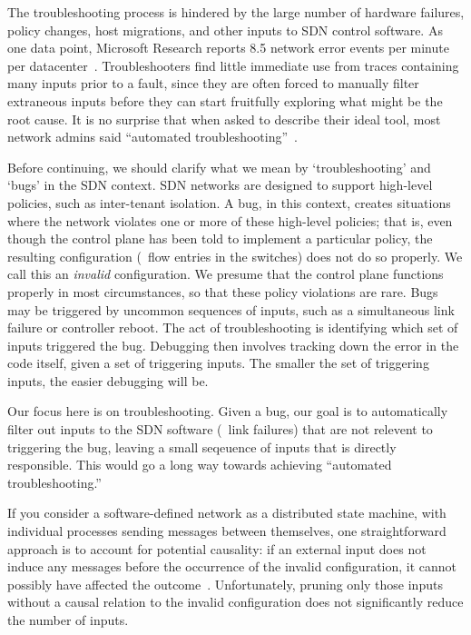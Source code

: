 The troubleshooting process is hindered by the large number of hardware failures,
policy changes, host migrations, and other inputs to SDN control software.
As one data point, Microsoft Research
reports 8.5 network error events per minute per
datacenter~\cite{Greenberg:2009:VSF:1592568.1592576}.
Troubleshooters find little immediate use from traces containing many inputs
prior to a fault,
since they are often forced to manually filter extraneous inputs
before they can start fruitfully exploring what might be the root cause.
It is no surprise that when asked to describe their
ideal tool, most network admins said ``automated troubleshooting''~\cite{Zeng:Survey}.


Before continuing, we should clarify what we mean by `troubleshooting' and `bugs' in the SDN context.
SDN networks are designed to support high-level policies, such as inter-tenant
isolation. A bug, in this context, creates situations
where the network violates one or more of these high-level policies; that is, even though the control plane
has been told to implement a particular policy, the resulting configuration (\ie~flow entries in the switches)
does not do so properly. We call this an {\em invalid} configuration.
We presume that the control plane functions properly in most circumstances, so
that these policy violations are rare.
Bugs may be triggered by uncommon sequences of inputs, such as a simultaneous link failure or controller reboot.
The act of troubleshooting is identifying which set of inputs triggered the bug.
Debugging then involves tracking down the error in the code itself, given a
set of triggering inputs.
The smaller the set of triggering inputs, the easier debugging will be.

Our focus here is on troubleshooting. Given a bug, our goal is
to automatically filter out inputs to the SDN software (\eg~link failures)
that are not relevent to triggering the bug, leaving a small seqeuence of inputs
that is directly responsible.
This would go a long way towards achieving ``automated troubleshooting.''

If you consider a software-defined network as a distributed state machine,
with individual processes sending messages between themselves, one straightforward approach is
to account for potential causality: if an external input does not induce any messages before
the occurrence of the invalid configuration, it
cannot possibly have affected the outcome~\cite{Lamport:1978:TCO:359545.359563}.
Unfortunately, pruning only those inputs without a causal relation to
the invalid configuration does not
significantly reduce the number of inputs.

